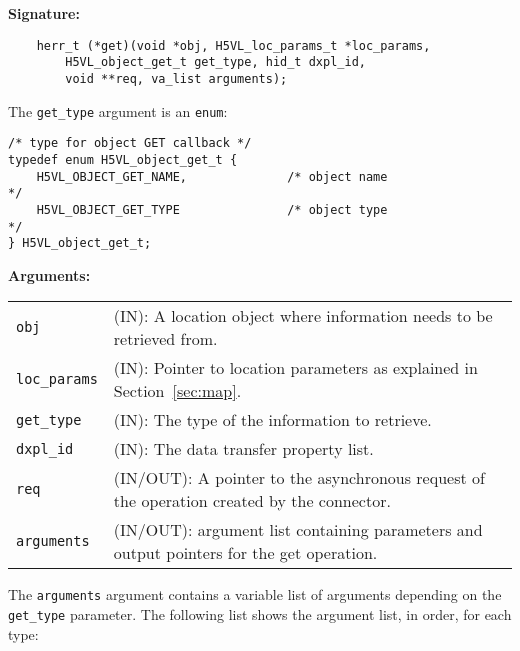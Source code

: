 \begin{mdframed}[style=bgbox]
\textbf{Signature:}
\begin{lstlisting}
    herr_t (*get)(void *obj, H5VL_loc_params_t *loc_params, 
        H5VL_object_get_t get_type, hid_t dxpl_id, 
        void **req, va_list arguments);
\end{lstlisting}

The \texttt{get\_type} argument is an \texttt{enum}:
\begin{lstlisting}
/* type for object GET callback */
typedef enum H5VL_object_get_t {                                                 
    H5VL_OBJECT_GET_NAME,              /* object name                       */   
    H5VL_OBJECT_GET_TYPE               /* object type                       */   
} H5VL_object_get_t; 
\end{lstlisting}

\textbf{Arguments:}\\
\begin{tabular}{l p{13.5cm}}
  \texttt{obj} & (IN): A location object where information needs to be
  retrieved from.\\
  \texttt{loc\_params} & (IN): Pointer to location parameters as
  explained in Section~\ref{sec:map}.\\
  \texttt{get\_type} & (IN): The type of the information to retrieve.\\
  \texttt{dxpl\_id} & (IN): The data transfer property list.\\
  \texttt{req} & (IN/OUT): A pointer to the asynchronous request of the
  operation created by the connector.\\
  \texttt{arguments} & (IN/OUT): argument list containing parameters and
  output pointers for the get operation. \\
\end{tabular}
\end{mdframed}

The \texttt{arguments} argument contains a variable list of arguments
depending on the \texttt{get\_type} parameter. The following list shows
the argument list, in order, for each type:

